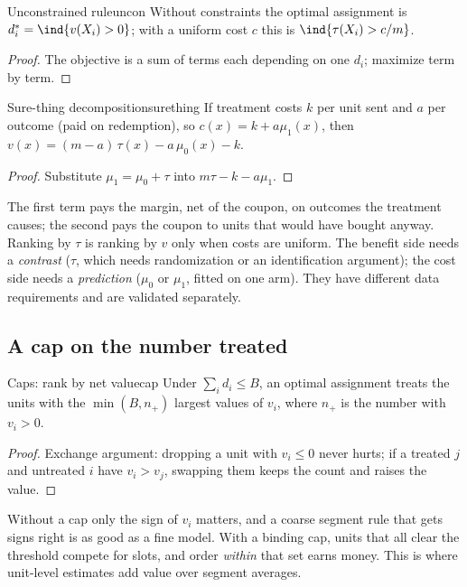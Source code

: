 \documentclass[11pt]{article}
\begin{document}
\begin{prop}{Unconstrained rule}{uncon}
Without constraints the optimal assignment is $d_i^\ast = \ind{v(X_i) > 0}$; with a uniform cost $c$ this is
$\ind{\tau(X_i) > c/m}$.
\end{prop}
\begin{proof}
The objective is a sum of terms each depending on one $d_i$; maximize term by term.
\end{proof}

\begin{prop}{Sure-thing decomposition}{surething}
If treatment costs $k$ per unit sent and $a$ per outcome (paid on redemption), so $c(x) = k + a\mu_1(x)$, then
$v(x) = (m - a)\,\tau(x) - a\,\mu_0(x) - k$.
\end{prop}
\begin{proof}
Substitute $\mu_1 = \mu_0 + \tau$ into $m\tau - k - a\mu_1$.
\end{proof}

The first term pays the margin, net of the coupon, on outcomes the treatment causes; the second pays the coupon to units
that would have bought anyway. Ranking by $\tau$ is ranking by $v$ only when costs are uniform. The benefit side needs a
\emph{contrast} ($\tau$, which needs randomization or an identification argument); the cost side needs a
\emph{prediction} ($\mu_0$ or $\mu_1$, fitted on one arm). They have different data requirements and are validated
separately.

\subsection{A cap on the number treated}

\begin{prop}{Caps: rank by net value}{cap}
Under $\sum_i d_i \le B$, an optimal assignment treats the units with the $\min(B, n_+)$ largest values of $v_i$, where
$n_+$ is the number with $v_i > 0$.
\end{prop}
\begin{proof}
Exchange argument: dropping a unit with $v_i \le 0$ never hurts; if a treated $j$ and untreated $i$ have $v_i > v_j$,
swapping them keeps the count and raises the value.
\end{proof}

Without a cap only the sign of $v_i$ matters, and a coarse segment rule that gets signs right is as good as a fine
model. With a binding cap, units that all clear the threshold compete for slots, and order \emph{within} that set earns
money. This is where unit-level estimates add value over segment averages.
\end{document}
